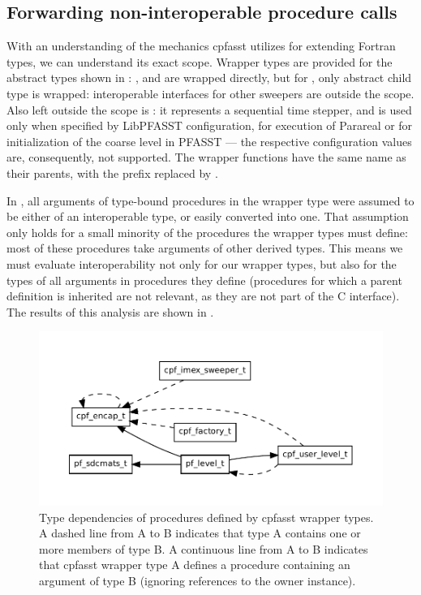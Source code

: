 \subsection{Forwarding non-interoperable procedure calls} \label{sec:impl_calls}

With an understanding of the mechanics cpfasst utilizes for extending Fortran types, we can understand its exact scope. Wrapper types are provided for the abstract types shown in : ,  and  are wrapped directly, but for , only abstract child type  is wrapped: interoperable interfaces for other sweepers are outside the scope. Also left outside the scope is : it represents a sequential time stepper, and is used only when specified by LibPFASST configuration, for execution of Parareal or for initialization of the coarse level in PFASST --- the respective configuration values are, consequently, not supported. The wrapper functions have the same name as their parents, with the prefix  replaced by .

In , all arguments of type-bound procedures in the wrapper type were assumed to be either of an interoperable type, or easily converted into one. That assumption only holds for a small minority of the procedures the wrapper types must define: most of these procedures take arguments of other derived types. This means we must evaluate interoperability not only for our wrapper types, but also for the types of all arguments in procedures they define (procedures for which a parent definition is inherited are not relevant, as they are not part of the C interface). The results of this analysis are shown in .

\begin{figure}[ht]
  \centering
  \includegraphics[width=\textwidth]{images/pfasst_dependencies.pdf}
  \caption{Type dependencies of procedures defined by cpfasst wrapper types. A dashed line from A to B indicates that type A contains one or more members of type B. A continuous line from A to B indicates that cpfasst wrapper type A defines a procedure containing an argument of type B (ignoring references to the owner instance).}
  \label{fig:libpfasst_dependencies}
\end{figure}

